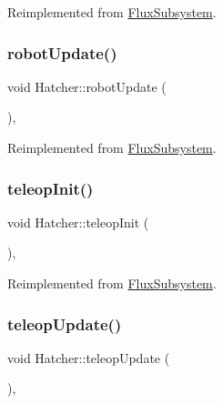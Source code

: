 Reimplemented from \hyperlink{classFluxSubsystem_aacd5ddfcadda0866d5e838de09a60d63}{Flux\+Subsystem}.

\mbox{\label{classHatcher_aacf85f8cc9f1c523ef7c4cd91808201e}} 
\subsubsection{\texorpdfstring{robot\+Update()}{robotUpdate()}}
{\footnotesize\ttfamily void Hatcher\+::robot\+Update (\begin{DoxyParamCaption}{ }\end{DoxyParamCaption})\hspace{0.3cm}{\ttfamily [override]}, {\ttfamily [virtual]}}



Reimplemented from \hyperlink{classFluxSubsystem_ac2b1c08b53251870e945edf7080c1549}{Flux\+Subsystem}.

\mbox{\label{classHatcher_ad51238ccec9093e1fa9c63f8f3aafa12}} 
\subsubsection{\texorpdfstring{teleop\+Init()}{teleopInit()}}
{\footnotesize\ttfamily void Hatcher\+::teleop\+Init (\begin{DoxyParamCaption}{ }\end{DoxyParamCaption})\hspace{0.3cm}{\ttfamily [override]}, {\ttfamily [virtual]}}



Reimplemented from \hyperlink{classFluxSubsystem_aec6d05e4f80c3783684598fb92ad2e55}{Flux\+Subsystem}.

\mbox{\label{classHatcher_a91517b2f54f6c8fc0f27506963a71d20}} 
\subsubsection{\texorpdfstring{teleop\+Update()}{teleopUpdate()}}
{\footnotesize\ttfamily void Hatcher\+::teleop\+Update (\begin{DoxyParamCaption}{ }\end{DoxyParamCaption})\hspace{0.3cm}{\ttfamily [override]}, {\ttfamily [virtual]}}



